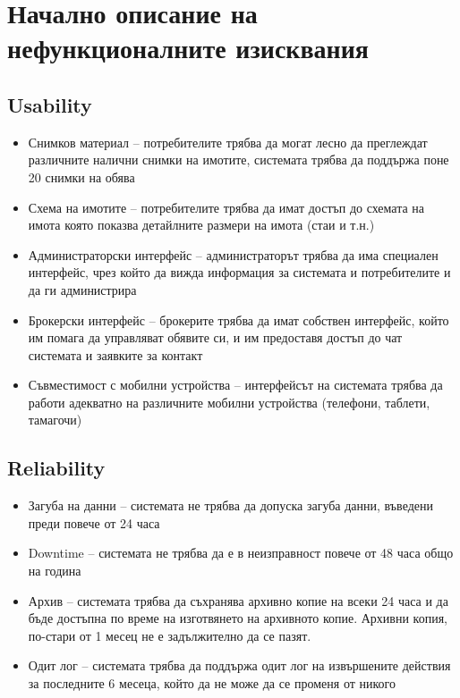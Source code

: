 \documentclass[a4paper]{article}
\begin{document}
\section{Начално описание на нефункционалните изисквания} \label{furps}

\subsection{Usability}
\begin{itemize} 
\item Снимков материал -- потребителите трябва да могат лесно да преглеждат различните налични снимки на имотите, системата трябва да поддържа поне 20 снимки на обява
\item Схема на имотите -- потребителите трябва да имат достъп до схемата на имота която показва детайлните размери на имота (стаи и т.н.)
\item Администраторски интерфейс -- администраторът трябва да има специален интерфейс, чрез който да вижда информация за системата и потребителите и да ги администрира
\item Брокерски интерфейс -- брокерите трябва да имат собствен интерфейс, който им помага да управляват обявите си, и им предоставя достъп до чат системата и заявките за контакт
\item Съвместимост с мобилни устройства -- интерфейсът на системата трябва да работи адекватно на различните мобилни устройства (телефони, таблети, тамагочи)
\end{itemize}

\subsection{Reliability}
\begin{itemize}
\item Загуба на данни -- системата не трябва да допуска загуба данни, въведени преди повече от 24 часа
\item Downtime -- системата не трябва да е в неизправност повече от 48 часа общо на година
\item Архив -- системата трябва да съхранява архивно копие на всеки 24 часа и да бъде достъпна по време на изготвянето на архивното копие. Архивни копия, по-стари от 1 месец не е задължително да се пазят.
\item Одит лог -- системата трябва да поддържа одит лог на извършените действия за последните 6 месеца, който да не може да се променя от никого
\end{itemize}
\end{document}
